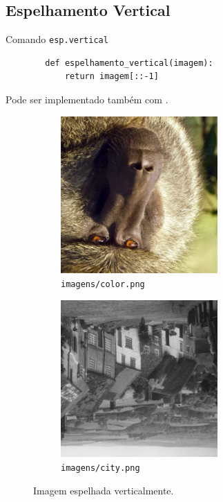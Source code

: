 \subsection{Espelhamento Vertical}

\begin{listing}[H]
    \caption{Comando \texttt{esp.vertical}}

    \begin{verbatim}
        def espelhamento_vertical(imagem):
            return imagem[::-1]
    \end{verbatim}
\end{listing}

Pode ser implementado também com  \autocite{ref:flip}.

\begin{figure}[H]
    \centering
    \begin{subfigure}{0.45\textwidth}
        \centering
        \includegraphics[width=6cm]{resultados/colorflip.png}
        \caption{\texttt{imagens/color.png}}
    \end{subfigure}%
    \begin{subfigure}{0.45\textwidth}
        \centering
        \includegraphics[width=6cm]{resultados/cityflip.png}
        \caption{\texttt{imagens/city.png}}
    \end{subfigure}

    \caption{Imagem espelhada verticalmente.}
\end{figure}
